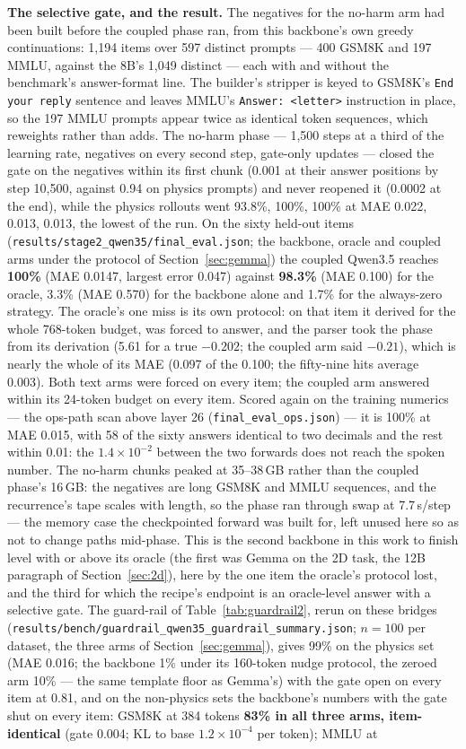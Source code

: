 \documentclass[11pt]{article}
\newcommand{\code}[1]{\texttt{#1}}
\begin{document}
\textbf{The selective gate, and the result.} The negatives for the no-harm arm had been built before the coupled phase ran, from this backbone's own greedy continuations: 1,194 items over 597 distinct prompts --- 400 GSM8K and 197 MMLU, against the 8B's 1,049 distinct --- each with and without the benchmark's answer-format line. The builder's stripper is keyed to GSM8K's \code{End your reply} sentence and leaves MMLU's \code{Answer:\ <letter>} instruction in place, so the 197 MMLU prompts appear twice as identical token sequences, which reweights rather than adds. The no-harm phase --- 1,500 steps at a third of the learning rate, negatives on every second step, gate-only updates --- closed the gate on the negatives within its first chunk (0.001 at their answer positions by step 10,500, against 0.94 on physics prompts) and never reopened it (0.0002 at the end), while the physics rollouts went 93.8\%, 100\%, 100\% at MAE 0.022, 0.013, 0.013, the lowest of the run. On the sixty held-out items (\code{results/stage2\_qwen35/final\_eval.json}; the backbone, oracle and coupled arms under the protocol of Section~\ref{sec:gemma}) the coupled Qwen3.5 reaches \textbf{100\%} (MAE 0.0147, largest error 0.047) against \textbf{98.3\%} (MAE 0.100) for the oracle, 3.3\% (MAE 0.570) for the backbone alone and 1.7\% for the always-zero strategy. The oracle's one miss is its own protocol: on that item it derived for the whole 768-token budget, was forced to answer, and the parser took the phase from its derivation (5.61 for a true $-0.202$; the coupled arm said $-0.21$), which is nearly the whole of its MAE (0.097 of the 0.100; the fifty-nine hits average 0.003). Both text arms were forced on every item; the coupled arm answered within its 24-token budget on every item. Scored again on the training numerics --- the ops-path scan above layer 26 (\code{final\_eval\_ops.json}) --- it is 100\% at MAE 0.015, with 58 of the sixty answers identical to two decimals and the rest within 0.01: the $1.4\times10^{-2}$ between the two forwards does not reach the spoken number. The no-harm chunks peaked at 35--38\,GB rather than the coupled phase's 16\,GB: the negatives are long GSM8K and MMLU sequences, and the recurrence's tape scales with length, so the phase ran through swap at 7.7\,s/step --- the memory case the checkpointed forward was built for, left unused here so as not to change paths mid-phase. This is the second backbone in this work to finish level with or above its oracle (the first was Gemma on the 2D task, the 12B paragraph of Section~\ref{sec:2d}), here by the one item the oracle's protocol lost, and the third for which the recipe's endpoint is an oracle-level answer with a selective gate. The guard-rail of Table~\ref{tab:guardrail2}, rerun on these bridges (\code{results/bench/guardrail\_qwen35\_guardrail\_summary.json}; $n{=}100$ per dataset, the three arms of Section~\ref{sec:gemma}), gives 99\% on the physics set (MAE 0.016; the backbone 1\% under its 160-token nudge protocol, the zeroed arm 10\% --- the same template floor as Gemma's) with the gate open on every item at 0.81, and on the non-physics sets the backbone's numbers with the gate shut on every item: GSM8K at 384 tokens \textbf{83\% in all three arms, item-identical} (gate 0.004; KL to base $1.2\times10^{-4}$ per token); MMLU at 
\end{document}
